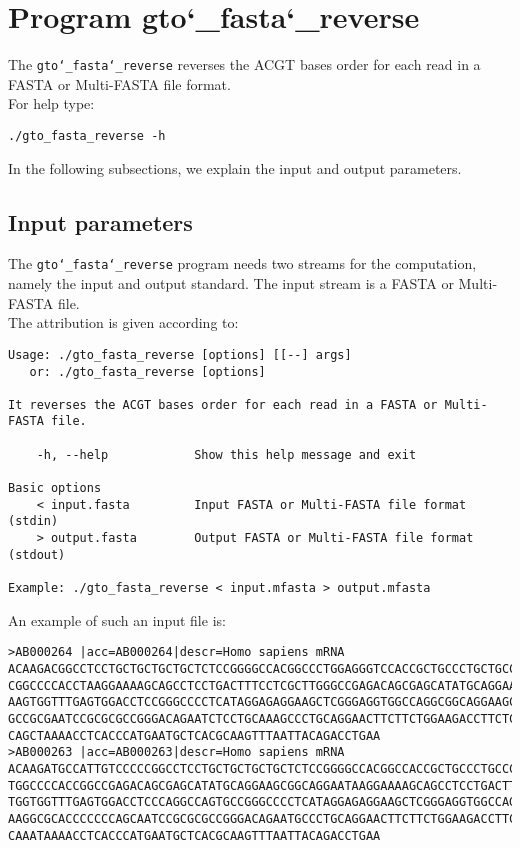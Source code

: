 \section{Program gto\char`_fasta\char`_reverse}
The \texttt{gto\char`_fasta\char`_reverse} reverses the ACGT bases order for each read in a FASTA or Multi-FASTA file format.\\
For help type:
\begin{lstlisting}
./gto_fasta_reverse -h
\end{lstlisting}
In the following subsections, we explain the input and output parameters.

\subsection*{Input parameters}

The \texttt{gto\char`_fasta\char`_reverse} program needs two streams for the computation, namely the input and output standard. The input stream is a FASTA or Multi-FASTA file.\\
The attribution is given according to:
\begin{lstlisting}
Usage: ./gto_fasta_reverse [options] [[--] args]
   or: ./gto_fasta_reverse [options]

It reverses the ACGT bases order for each read in a FASTA or Multi-FASTA file.

    -h, --help            Show this help message and exit

Basic options
    < input.fasta         Input FASTA or Multi-FASTA file format (stdin)
    > output.fasta        Output FASTA or Multi-FASTA file format (stdout)

Example: ./gto_fasta_reverse < input.mfasta > output.mfasta
\end{lstlisting}
An example of such an input file is:
\begin{lstlisting}
>AB000264 |acc=AB000264|descr=Homo sapiens mRNA 
ACAAGACGGCCTCCTGCTGCTGCTGCTCTCCGGGGCCACGGCCCTGGAGGGTCCACCGCTGCCCTGCTGCCATTGTCCC
CGGCCCCACCTAAGGAAAAGCAGCCTCCTGACTTTCCTCGCTTGGGCCGAGACAGCGAGCATATGCAGGAAGCGGCAGG
AAGTGGTTTGAGTGGACCTCCGGGCCCCTCATAGGAGAGGAAGCTCGGGAGGTGGCCAGGCGGCAGGAAGCAGGCCAGT
GCCGCGAATCCGCGCGCCGGGACAGAATCTCCTGCAAAGCCCTGCAGGAACTTCTTCTGGAAGACCTTCTCCACCCCCC
CAGCTAAAACCTCACCCATGAATGCTCACGCAAGTTTAATTACAGACCTGAA
>AB000263 |acc=AB000263|descr=Homo sapiens mRNA 
ACAAGATGCCATTGTCCCCCGGCCTCCTGCTGCTGCTGCTCTCCGGGGCCACGGCCACCGCTGCCCTGCCCCTGGAGGG
TGGCCCCACCGGCCGAGACAGCGAGCATATGCAGGAAGCGGCAGGAATAAGGAAAAGCAGCCTCCTGACTTTCCTCGCT
TGGTGGTTTGAGTGGACCTCCCAGGCCAGTGCCGGGCCCCTCATAGGAGAGGAAGCTCGGGAGGTGGCCAGGCGGCAGG
AAGGCGCACCCCCCCAGCAATCCGCGCGCCGGGACAGAATGCCCTGCAGGAACTTCTTCTGGAAGACCTTCTCCTCCTG
CAAATAAAACCTCACCCATGAATGCTCACGCAAGTTTAATTACAGACCTGAA
\end{lstlisting}

